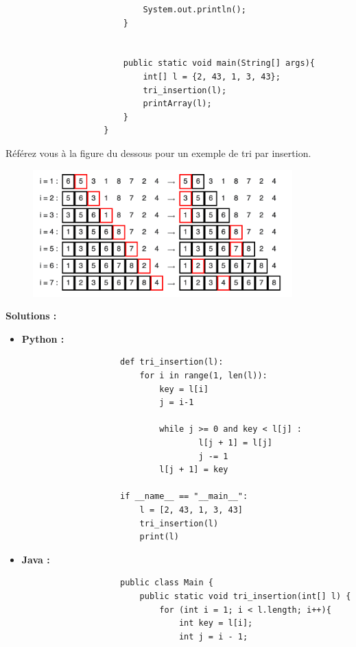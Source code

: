 \begin{Exercice} [20 minutes]
\begin{itemize}
\begin{verbatim}
                            System.out.println(); 
                        } 
              
                        
                        public static void main(String[] args){
                            int[] l = {2, 43, 1, 3, 43};
                            tri_insertion(l);
                            printArray(l);
                        }
                    }
                \end{verbatim}
    \end{itemize}
    
    \begin{conseil}
        Référez vous à la figure du dessous pour un exemple de tri par insertion.
    \end{conseil}
    
    \begin{figure}[h!]
        \centering
        \includegraphics[width=10cm]{ressources/tri_insertion.png}
    \end{figure}

    \textbf{Solutions :}
    \begin{itemize}
        \item \textbf{Python :}
                \begin{verbatim}
                    def tri_insertion(l):
                        for i in range(1, len(l)):
                            key = l[i] 
                            j = i-1
                            
                            while j >= 0 and key < l[j] : 
                                    l[j + 1] = l[j] 
                                    j -= 1
                            l[j + 1] = key 
                    
                    if __name__ == "__main__":
                        l = [2, 43, 1, 3, 43]
                        tri_insertion(l)
                        print(l)
                \end{verbatim}
        \item \textbf{Java :}
                \begin{verbatim}
                    public class Main {
                        public static void tri_insertion(int[] l) {
                            for (int i = 1; i < l.length; i++){
                                int key = l[i]; 
                                int j = i - 1; 
                      

\end{verbatim}
\end{itemize}
\end{Exercice}
